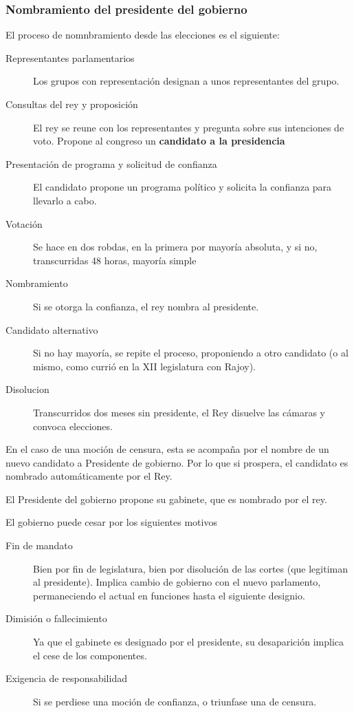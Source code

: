     \subsubsection{Nombramiento del presidente del gobierno}
        El proceso de nomnbramiento desde las elecciones es el siguiente:
        \begin{description}
            \item[Representantes parlamentarios] Los grupos con representación designan a unos representantes del grupo.
            \item[Consultas del rey y proposición] El rey se reune con los representantes y pregunta sobre sus intenciones de voto. Propone al congreso un \textbf{candidato a la presidencia} 
            \item[Presentación de programa y solicitud de confianza] El candidato propone un programa político y solicita la confianza para llevarlo a cabo.
            \item[Votación] Se hace en dos robdas, en la primera por mayoría absoluta, y si no, transcurridas 48 horas, mayoría simple
            \item[Nombramiento] Si se otorga la confianza, el rey nombra al presidente.
            \item[Candidato alternativo] Si no hay mayoría, se repite el proceso, proponiendo a otro candidato (o al mismo, como currió en la XII legislatura con Rajoy).
            \item[Disolucion] Transcurridos dos meses sin presidente, el Rey disuelve las cámaras y convoca elecciones.
        \end{description}

        En el caso de una moción de censura, esta se acompaña por el nombre de un nuevo candidato a Presidente de gobierno. Por lo que si prospera, el candidato es nombrado automáticamente por el Rey.

        El Presidente del gobierno propone su gabinete, que es nombrado por el rey.

        El gobierno puede cesar por los siguientes motivos
        \begin{description}
            \item[Fin de mandato] Bien por fin de legislatura, bien por disolución de las cortes (que legitiman al presidente). Implica cambio de gobierno con el nuevo parlamento, permaneciendo el actual en funciones hasta el siguiente designio.
            \item[Dimisión o fallecimiento] Ya que el gabinete es designado por el presidente, su desaparición implica el cese de los componentes.
            \item[Exigencia de responsabilidad] Si se perdiese una moción de confianza, o triunfase una de censura.
        \end{description}
    
